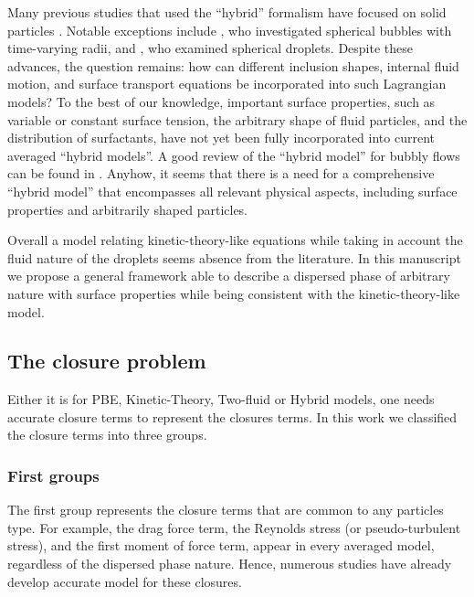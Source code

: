 Many previous studies that used the ``hybrid'' formalism have focused on solid particles \citep{buyevich1979flow,jackson1997locally}. 
Notable exceptions include \citet{zhang1994ensemble}, who investigated spherical bubbles with time-varying radii, and \citet{zhang1997momentum}, who examined spherical droplets. 
Despite these advances, the question remains: how can different inclusion shapes, internal fluid motion, and surface transport equations be incorporated into such Lagrangian models? 
To the best of our knowledge, important surface properties, such as variable or constant surface tension, the arbitrary shape of fluid particles, and the distribution of surfactants, have not yet been fully incorporated into current averaged ``hybrid models''.  
A good review of the ``hybrid model'' for bubbly flows can be found in \citet{morel2015mathematical}. 
Anyhow, it seems that there is a need for a comprehensive ``hybrid model'' that encompasses all relevant physical aspects, including surface properties and arbitrarily shaped particles.

Overall a model relating kinetic-theory-like equations while taking in account the fluid nature of the droplets seems absence from the literature. 
In this manuscript we propose a general framework able to describe a dispersed phase of arbitrary nature with surface properties while being consistent with the kinetic-theory-like model.

\subsection{The closure problem}

Either it is for PBE, Kinetic-Theory, Two-fluid or Hybrid  models, one needs accurate closure terms to represent the closures terms. 
In this work we classified the closure terms into three groups. 


\subsubsection{First groups}
The first group represents the closure terms that are common to any particles type. 
For example, the drag force term, the Reynolds stress (or pseudo-turbulent stress), and the first moment of force term, appear in every averaged model, regardless of the dispersed phase nature. 
Hence, numerous studies have already develop accurate model for these closures. 

